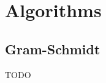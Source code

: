 \documentclass{book}
\begin{document}







\chapter{Algorithms}

\section{Gram-Schmidt}
TODO


\end{document}
